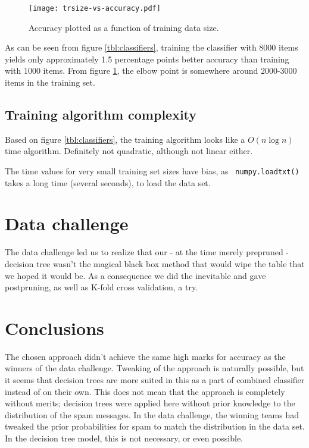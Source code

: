 \documentclass[a4paper,10pt]{article}
\begin{document}
\begin{figure}[h]
  \centering
  \begin{minipage}[c]{1.0\textwidth}
    \centering
\texttt{[image: trsize-vs-accuracy.pdf]}
  \end{minipage}
  \caption{Accuracy plotted as a function of training data size.}
  \label{fig:trsize-vs-accuracy}
\end{figure}

As can be seen from figure \ref{tbl:classifiers}, training the
classifier with 8000 items yields only approximately 1.5 percentage
points better accuracy than training with 1000 items.  From figure
\ref{fig:trsize-vs-accuracy}, the elbow point is somewhere around
2000-3000 items in the training set.

\subsection{Training algorithm complexity}

Based on figure \ref{tbl:classifiers}, the training algorithm looks like a
$O(n\log{n})$ time algorithm.  Definitely not quadratic, although not linear
either.

The time values for very small training set sizes have bias, as {\tt
  numpy.loadtxt()} takes a long time (several seconds), to load the data
set.

\section{Data challenge}


The data challenge led us to realize that our - at the time merely
prepruned - decision tree wasn't the magical black box method
that would wipe the table that we hoped it would be.
As a consequence we did the inevitable and gave postpruning,
as well as K-fold cross validation, a try.


\section{Conclusions}

The chosen approach didn't achieve the same high marks for accuracy as
the winners of the data challenge.  Tweaking of the approach is
naturally possible, but it seems that decision trees are more suited in
this as a part of combined classifier instead of on their own.  This
does not mean that the approach is completely without merits; decision
trees were applied here without prior knowledge to the distribution of
the spam messages.  In the data challenge, the winning teams had tweaked
the prior probabilities for spam to match the distribution in the data
set.  In the decision tree model, this is not necessary, or even
possible.
\end{document}
